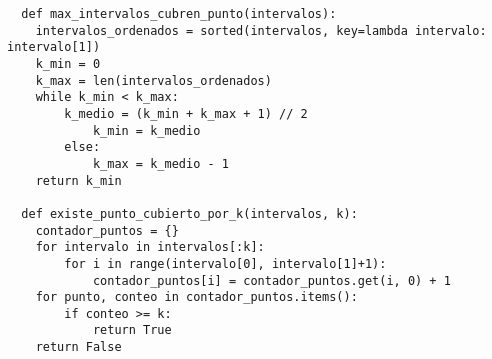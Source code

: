 \begin{itemize}
  \begin{lstlisting}
  def max_intervalos_cubren_punto(intervalos):
    intervalos_ordenados = sorted(intervalos, key=lambda intervalo: intervalo[1])
    k_min = 0
    k_max = len(intervalos_ordenados)
    while k_min < k_max:
        k_medio = (k_min + k_max + 1) // 2
            k_min = k_medio
        else:
            k_max = k_medio - 1
    return k_min

  def existe_punto_cubierto_por_k(intervalos, k):
    contador_puntos = {}
    for intervalo in intervalos[:k]:
        for i in range(intervalo[0], intervalo[1]+1):
            contador_puntos[i] = contador_puntos.get(i, 0) + 1
    for punto, conteo in contador_puntos.items():
        if conteo >= k:
            return True
    return False

  \end{lstlisting}
\end{itemize}
